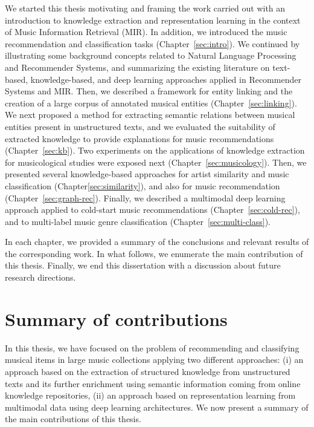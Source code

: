 We started this thesis motivating and framing the work carried out with an introduction to knowledge extraction and representation learning in the context of Music Information Retrieval (MIR). In addition, we introduced the music recommendation and classification tasks (Chapter~\ref{sec:intro}). We continued by illustrating some background concepts related to Natural Language Processing and Recommender Systems, and summarizing the existing literature on text-based, knowledge-based, and deep learning approaches applied in Recommender Systems and MIR. Then, we described a framework for entity linking and the creation of a large corpus of annotated musical entities (Chapter~\ref{sec:linking}). We next proposed a method for extracting semantic relations between musical entities present in unstructured texts, and we evaluated the suitability of extracted knowledge to provide explanations for music recommendations (Chapter~\ref{sec:kb}). Two experiments on the applications of knowledge extraction for musicological studies were exposed next (Chapter~\ref{sec:musicology}). Then, we presented several knowledge-based approaches for artist similarity and music classification (Chapter\ref{sec:similarity}), and also for music recommendation (Chapter~\ref{sec:graph-rec}). Finally, we described a multimodal deep learning approach applied to cold-start music recommendations (Chapter~\ref{sec:cold-rec}), and to multi-label music genre classification (Chapter~\ref{sec:multi-class}).

In each chapter, we provided a summary of the conclusions and relevant results of the corresponding work. In what follows, we enumerate the main contribution of this thesis. Finally, we end this dissertation with a discussion about future research directions.

\section{Summary of contributions}
\label{sec:conclusion:summary}

In this thesis, we have focused on the problem of recommending and classifying musical items in large music collections applying two different approaches: (i) an approach based on the extraction of structured knowledge from unstructured texts and its further enrichment using semantic information coming from online knowledge repositories, (ii) an approach based on representation learning from multimodal data using deep learning architectures. We now present a summary of the main contributions of this thesis.

